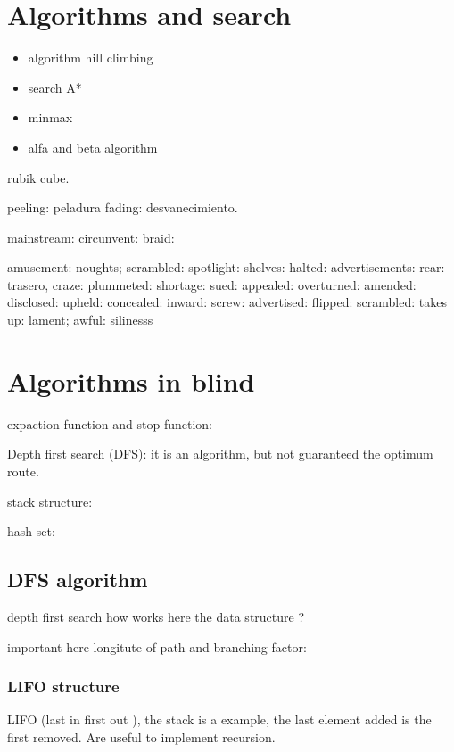 \documentclass[10pt,a4paper]{article}
\begin{document}
\section{Algorithms and search}

\begin{itemize}
\item algorithm hill climbing
\item search A*
\item minmax 
\item alfa and beta algorithm
\end{itemize}






rubik cube.


peeling: peladura
fading: desvanecimiento.

mainstream:
circunvent:
braid:

amusement:
noughts;
scrambled:
spotlight:
shelves:
halted:
advertisements:
rear: trasero,
craze:
plummeted:
shortage:
sued:
appealed:
overturned:
amended:
disclosed:
upheld:
concealed:
inward:
screw:
advertised:
flipped:
scrambled:
takes up:
lament;
awful:
silinesss



\section{Algorithms in blind}

expaction function 
and stop function:




Depth first search (DFS):
it is an algorithm, but not guaranteed the optimum route.


stack structure:



hash set:




\subsection{DFS algorithm}
depth first search 
how works here the data structure ?


important here longitute of path and branching factor:


\subsubsection{LIFO structure }
LIFO (last in first out ), the stack is a example, the last element added is the first removed. Are useful to implement recursion.
\end{document}
